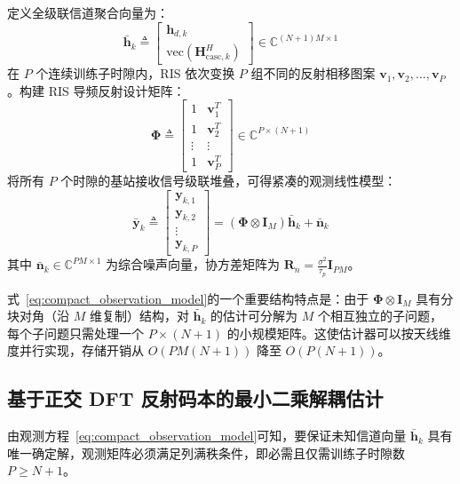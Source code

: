 定义全级联信道聚合向量为：
\begin{equation}
  \bar{\bm{h}}_k \triangleq \begin{bmatrix} \bm{h}_{d,k} \\ \mathrm{vec}(\bm{H}_{\mathrm{casc},k}^H) \end{bmatrix} \in \mathbb{C}^{(N+1)M \times 1}
  \label{eq:aggregated_channel_vector}
\end{equation}
在 $P$ 个连续训练子时隙内，RIS 依次变换 $P$ 组不同的反射相移图案 $\bm{v}_1, \bm{v}_2, \dots, \bm{v}_P$。构建 RIS 导频反射设计矩阵：
\begin{equation}
  \bm{\Phi} \triangleq \begin{bmatrix}
    1 & \bm{v}_1^T \\
    1 & \bm{v}_2^T \\
    \vdots & \vdots \\
    1 & \bm{v}_P^T
  \end{bmatrix} \in \mathbb{C}^{P \times (N+1)}
  \label{eq:ris_pilot_matrix_phi}
\end{equation}
将所有 $P$ 个时隙的基站接收信号级联堆叠，可得紧凑的观测线性模型：
\begin{equation}
  \bar{\bm{y}}_k \triangleq \begin{bmatrix} \bm{y}_{k,1} \\ \bm{y}_{k,2} \\ \vdots \\ \bm{y}_{k,P} \end{bmatrix} = \left( \bm{\Phi} \otimes \bm{I}_M \right) \bar{\bm{h}}_k + \bar{\bm{n}}_k
  \label{eq:compact_observation_model}
\end{equation}
其中 $\bar{\bm{n}}_k \in \mathbb{C}^{PM \times 1}$ 为综合噪声向量，协方差矩阵为 $\bm{R}_n = \frac{\sigma^2}{\tau_p}\bm{I}_{PM}$。

式~\eqref{eq:compact_observation_model}的一个重要结构特点是：由于 $\bm{\Phi} \otimes \bm{I}_M$ 具有分块对角（沿 $M$ 维复制）结构，对 $\bar{\bm{h}}_k$ 的估计可分解为 $M$ 个相互独立的子问题，每个子问题只需处理一个 $P \times (N+1)$ 的小规模矩阵。这使估计器可以按天线维度并行实现，存储开销从 $O(PM(N+1))$ 降至 $O(P(N+1))$。

\subsection{基于正交 DFT 反射码本的最小二乘解耦估计}
\label{sec:dft_codebook}

由观测方程~\eqref{eq:compact_observation_model}可知，要保证未知信道向量 $\bar{\bm{h}}_k$ 具有唯一确定解，观测矩阵必须满足列满秩条件，即必需且仅需训练子时隙数 $P \ge N+1$。

